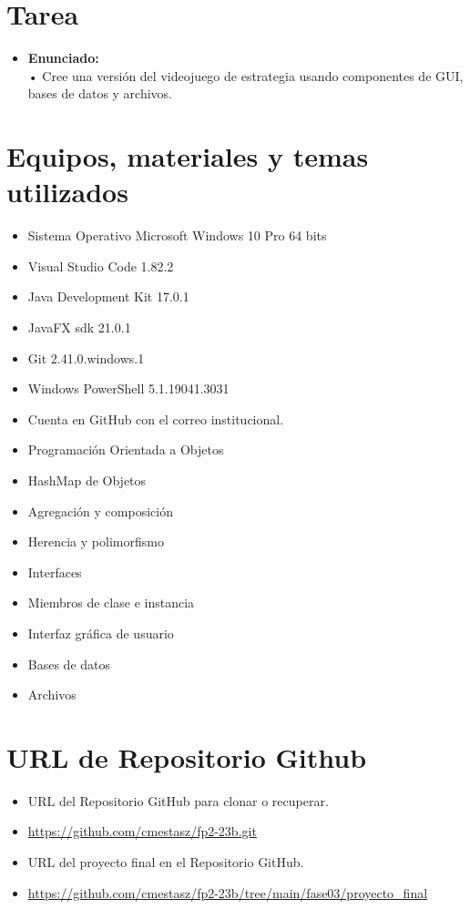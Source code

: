 \documentclass{article}
\begin{document}
\section{Tarea}
\begin{itemize}
	\item \textbf{Enunciado:}
	      \\• Cree una versión del videojuego de estrategia usando componentes de GUI, bases de datos y archivos.
\end{itemize}
\pagebreak

\section{Equipos, materiales y temas utilizados}
\begin{itemize}
	\item Sistema Operativo Microsoft Windows 10 Pro 64 bits
	\item Visual Studio Code 1.82.2
	\item Java Development Kit 17.0.1
	\item JavaFX sdk 21.0.1
	\item Git 2.41.0.windows.1
	\item Windows PowerShell 5.1.19041.3031
	\item Cuenta en GitHub con el correo institucional.
	\item Programación Orientada a Objetos
	\item HashMap de Objetos
	\item Agregación y composición
	\item Herencia y polimorfismo
	\item Interfaces
	\item Miembros de clase e instancia
	\item Interfaz gráfica de usuario
	\item Bases de datos
	\item Archivos
\end{itemize}

\section{URL de Repositorio Github}
\begin{itemize}
	\item URL del Repositorio GitHub para clonar o recuperar.
	\item \url{https://github.com/cmestasz/fp2-23b.git}
	\item URL del proyecto final en el Repositorio GitHub.
	\item \url{https://github.com/cmestasz/fp2-23b/tree/main/fase03/proyecto_final}
\end{itemize}
\pagebreak
\end{document}
